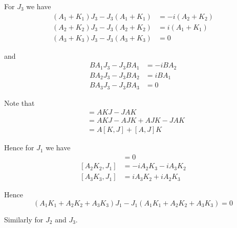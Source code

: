 For $J_3$ we have
\begin{align*}
(A_1+K_1)J_3-J_3(A_1+K_1)&=-i(A_2+K_2)
\\
(A_2+K_2)J_3-J_3(A_2+K_2)&=i(A_1+K_1)
\\
(A_3+K_3)J_3-J_3(A_3+K_3)&=0
\end{align*}

and
\begin{align*}
BA_1J_3-J_3BA_1&=-iBA_2
\\
BA_2J_3-J_3BA_2&=iBA_1
\\
BA_3J_3-J_3BA_3&=0
\end{align*}

Note that
\begin{align*}
[AK,J]&=AKJ-JAK
\\
&=AKJ-AJK+AJK-JAK
\\
&=A[K,J]+[A,J]K
\end{align*}

Hence for $J_1$ we have
\begin{align*}
[A_1K_1,J_1]&=0
\\
[A_2K_2,J_1]&=-iA_2K_3-iA_3K_2
\\
[A_3K_3,J_1]&=iA_3K_2+iA_2K_3
\end{align*}

Hence
\begin{equation*}
(A_1K_1+A_2K_2+A_3K_3)J_1-J_1(A_1K_1+A_2K_2+A_3K_3)=0
\end{equation*}

Similarly for $J_2$ and $J_3$.


